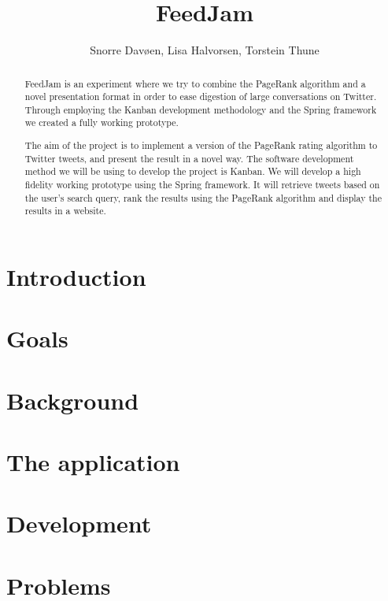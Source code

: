 \documentclass[a4paper,pt12]{article}
\begin{document}
\title{FeedJam}
\author{Snorre Davøen, Lisa Halvorsen, Torstein Thune}
 
\maketitle
\begin{abstract}
FeedJam is an experiment where we try to combine the PageRank algorithm and a novel presentation format in order to ease digestion of large conversations on Twitter. Through employing the Kanban development methodology and the Spring framework we created a fully working prototype.

The aim of the project is to implement a version of the PageRank rating algorithm to Twitter tweets, and present the result in a novel way. The software development method we will be using to develop the project is Kanban. We will develop a high fidelity working prototype using the Spring framework. It will retrieve tweets based on the user’s search query, rank the results using the PageRank algorithm and display the results in a website.     

\end{abstract}
\newpage

\tableofcontents
\newpage

\section{Introduction}



\section{Goals}


\section{Background}


\section{The application}


\section{Development}


\section{Problems}

\end{document}
